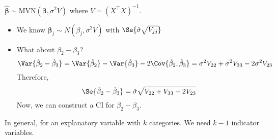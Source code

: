 $ \hat{\symbf{\beta}}\sim \text{MVN}(\symbf{\beta},\sigma^2 V) $
where $ V=(X^\top X)^{-1} $.
\begin{itemize}
    \item We know $ \hat{\symbf{\beta}}_j \sim N(\beta_j,\sigma^2 V) $
          with $ \Se{\hat{\sigma}\sqrt{V_{jj}}} $
    \item What about $ \beta_2-\beta_3 $?
          \[ \Var{\hat{\beta}_2-\hat{\beta}_3}=
              \Var{\hat{\beta}_2}-\Var{\hat{\beta}_3}-2\Cov{\hat{\beta}_2,\hat{\beta}_3}
              =\sigma^2V_{22}+\sigma^2V_{33}-2\sigma^2V_{23} \]
          Therefore,
          \[ \Se{\hat{\beta}_2-\hat{\beta}_3}=\hat{\sigma}\sqrt{V_{22}+V_{33}-2V_{23}} \]
          Now, we can construct a CI for $ \beta_2-\beta_3 $.
\end{itemize}
In general, for an explanatory variable with $ k $ categories.
We need $ k-1 $ indicator variables.
